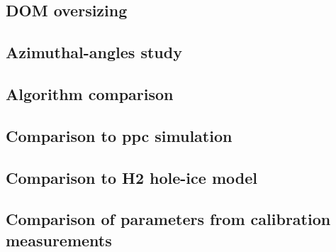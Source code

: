 \documentclass[green, 12pt]{beamer}
\begin{document}
%  

%  
%  

\subsection{DOM oversizing}
  

\subsection{Azimuthal-angles study}
  

\subsection{Algorithm comparison}
  

\subsection{Comparison to ppc simulation}
  
\subsection{Comparison to H2 hole-ice model}
  
\subsection{Comparison of parameters from calibration measurements}
  
\end{document}
